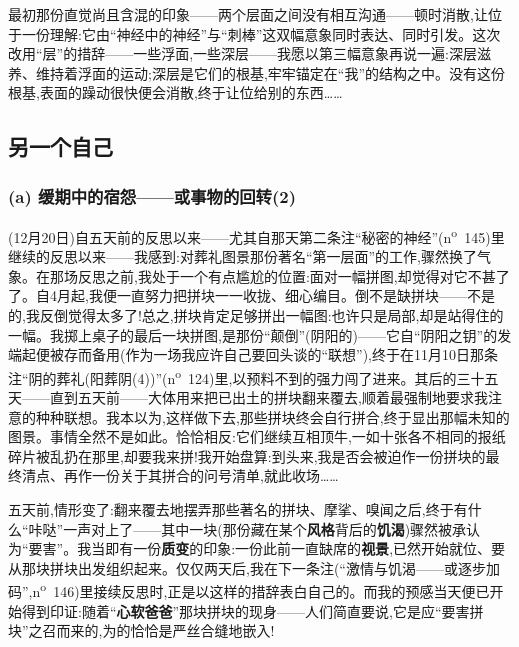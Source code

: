 最初那份直觉尚且含混的印象——两个层面之间没有相互沟通——顿时消散,让位于一份理解:它由“神经中的神经”与“刺棒”这双幅意象同时表达、同时引发。这次改用“层”的措辞——一些浮面,一些深层——我愿以第三幅意象再说一遍:深层滋养、维持着浮面的运动;深层是它们的根基,牢牢锚定在“我”的结构之中。没有这份根基,表面的躁动很快便会消散,终于让位给别的东西……

\subsection{另一个自己}
\label{ch18:local:h62}

\subsubsection*{(a) 缓期中的宿怨——或事物的回转(2)}
\label{ch18:local:h63}

\label{ch18:local:n57}

\dmark{}(12月20日)自五天前的反思以来——尤其自那天第二条注“秘密的神经”(n\textsuperscript{o}~145)里继续的反思以来——我感到:对葬礼图景那份著名“第一层面”的工作,骤然换了气象。在那场反思之前,我处于一个有点尴尬的位置:面对一幅拼图,却觉得对它不甚了了。自4月起,我便一直努力把拼块一一收拢、细心编目。倒不是缺拼块——不是的,我反倒觉得太多了!总之,拼块肯定足够拼出一幅图:也许只是局部,却是站得住的一幅。我掷上桌子的最后一块拼图,是那份“颠倒”(阴阳的)——它自“阴阳之钥”的发端起便被存而备用(作为一场我应许自己要回头谈的“联想”),终于在11月10日那条注“阴的葬礼(阳葬阴(4))”(n\textsuperscript{o}~124)里,以预料不到的强力闯了进来。其后的三十五天——直到五天前——大体用来把已出土的拼块翻来覆去,顺着最强制地要求我注意的种种联想。我本以为,这样做下去,那些拼块终会自行拼合,终于显出那幅未知的图景。事情全然不是如此。恰恰相反:它们继续互相顶牛,一如十张各不相同的报纸碎片被乱扔在那里,却要我来拼!我开始盘算:到头来,我是否会被迫作一份拼块的最终清点、再作一份关于其拼合的问号清单,就此收场……

五天前,情形变了:翻来覆去地摆弄那些著名的拼块、摩挲、嗅闻之后,终于有什么“咔哒”一声对上了——其中一块(那份藏在某个\textbf{风格}背后的\textbf{饥渴})骤然被承认为“要害”。我当即有一份\textbf{质变}的印象:一份此前一直缺席的\textbf{视景},已然\dmark{}开始就位、要从那块拼块出发组织起来。仅仅两天后,我在下一条注(“激情与饥渴——或逐步加码”,n\textsuperscript{o}~146)里接续反思时,正是以这样的措辞表白自己的。而我的预感当天便已开始得到印证:随着“\textbf{心软爸爸}”那块拼块的现身——人们简直要说,它是应“要害拼块”之召而来的,为的恰恰是严丝合缝地嵌入!


